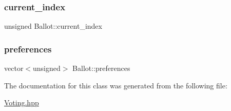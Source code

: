 \subsubsection{\texorpdfstring{current\+\_\+index}{current\_index}}
{\footnotesize\ttfamily unsigned Ballot\+::current\+\_\+index}

\mbox{\label{classBallot_a8210cf254af4cf9fa1d1e7f7f4230ceb}} 
\subsubsection{\texorpdfstring{preferences}{preferences}}
{\footnotesize\ttfamily vector$<$unsigned$>$ Ballot\+::preferences}



The documentation for this class was generated from the following file\+:\begin{DoxyCompactItemize}
\item 
\hyperlink{Voting_8hpp}{Voting.\+hpp}\end{DoxyCompactItemize}
